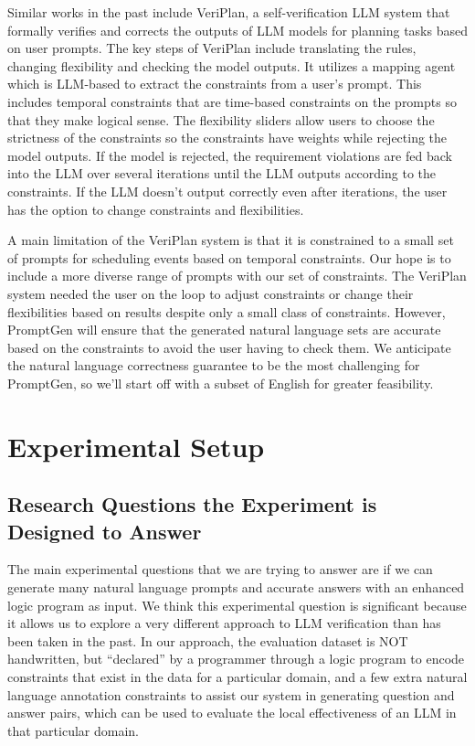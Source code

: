 \documentclass{article}
\begin{document}
Similar works in the past include VeriPlan, a self-verification LLM system that formally verifies and corrects the outputs of LLM models for planning tasks based on user prompts.  The key steps of VeriPlan include translating the rules, changing flexibility and checking the model outputs.  It utilizes a mapping agent which is LLM-based to extract the constraints from a user’s prompt.  This includes temporal constraints that are time-based constraints on the prompts so that they make logical sense.  The flexibility sliders allow users to choose the strictness of the constraints so the constraints have weights while rejecting the model outputs.  If the model is rejected, the requirement violations are fed back into the LLM over several iterations until the LLM outputs according to the constraints.  If the LLM doesn’t output correctly even after iterations, the user has the option to change constraints and flexibilities.

A main limitation of the VeriPlan system is that it is constrained to a small set of prompts for scheduling events based on temporal constraints.  Our hope is to include a more diverse range of prompts with our set of constraints.  The VeriPlan system needed the user on the loop to adjust constraints or change their flexibilities based on results despite only a small class of constraints.   However, PromptGen will ensure that the generated natural language sets are accurate based on the constraints to avoid the user having to check them.  We anticipate the natural language correctness guarantee to be the most challenging for PromptGen, so we’ll start off with a subset of English for greater feasibility.


\section{Experimental Setup}
\subsection{Research Questions the Experiment is Designed to Answer}
The main experimental questions that we are trying to answer are if we can generate many natural language prompts and accurate answers with an enhanced logic program as input. We think this experimental question is significant because it allows us to explore a very different approach to LLM verification than has been taken in the past. In our approach, the evaluation dataset is NOT handwritten, but “declared” by a programmer through a logic program to encode constraints that exist in the data for a particular domain, and a few extra natural language annotation constraints to assist our system in generating question and answer pairs, which can be used to evaluate the local effectiveness of an LLM in that particular domain.
\end{document}
